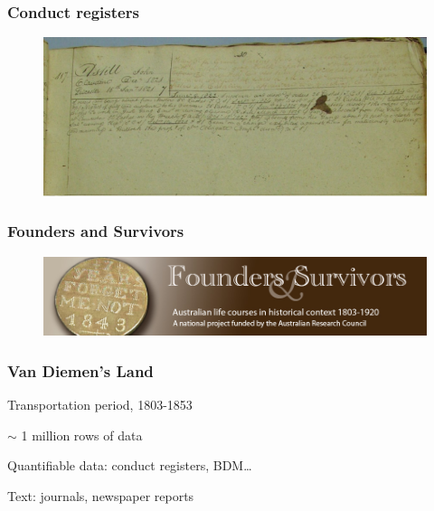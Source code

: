 \documentclass[ignorenonframetext,11pt]{beamer}
\begin{document}
\begin{frame}
\frametitle{Conduct registers}
\label{conductregisters}

\begin{figure}
	\label{johnastill}
	\begin{center}
	\includegraphics[keepaspectratio,width=\textwidth, height=.75\textheight]{images/Astill-cr.jpg}
	\end{center}
	\end{figure}
	



\end{frame}
		

\begin{frame}
\frametitle{Founders and Survivors}
\label{foundersandsurvivors}

\begin{figure}
	\label{foundersandsurvivors}
	\begin{center}
	\includegraphics[keepaspectratio,width=\textwidth, height=.75\textheight]{images/logo.jpg}
	\end{center}
	\end{figure}
	



\end{frame}
		

\begin{frame}
\frametitle{Van Diemen's Land}
\label{vandiemensland}

Transportation period, 1803-1853


\ensuremath{\sim} 1 million rows of data


Quantifiable data: conduct registers, BDM{\ldots}


Text: journals, newspaper reports



\end{frame}
		
\end{document}
